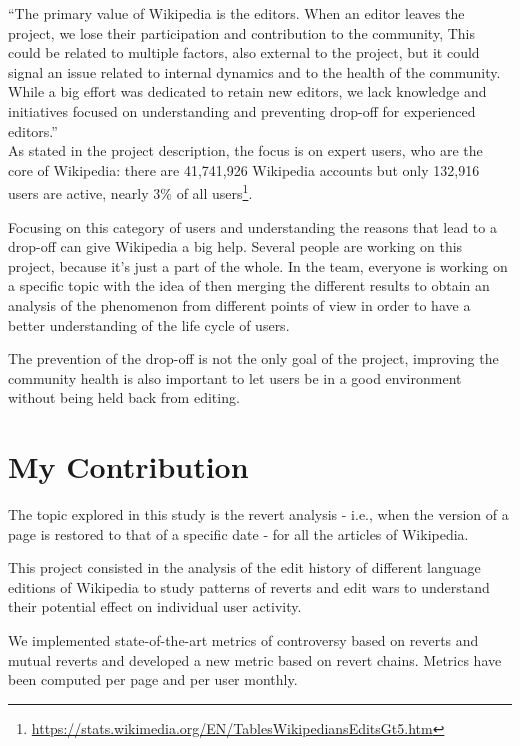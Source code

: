 “The primary value of Wikipedia is the editors. When an editor leaves the project, we lose their
participation and contribution to the community, This could be related to multiple factors, also
external to the project, but it could signal an issue related to internal dynamics and to the health
of the community. While a big effort was dedicated to retain new editors, we lack knowledge and
initiatives focused on understanding and preventing drop-off for experienced editors.”
\\
As stated in the project description, the focus is on expert users, who are the core of Wikipedia:
there are 41,741,926 Wikipedia accounts but only 132,916 users are active, nearly 3\% of all
users\footnote{\url{https://stats.wikimedia.org/EN/TablesWikipediansEditsGt5.htm}}. 

Focusing on this category of users and understanding the reasons that lead to a drop-off can give Wikipedia a
big help. Several people are working on this project, because it's just a part of the whole.
In the team, everyone is working on a specific topic with the idea of then merging the different
results to obtain an analysis of the phenomenon from different points of view in order to have a
better understanding of the life cycle of users.  

The prevention of the drop-off is not the only goal of the project, improving the community health
is also important to let users be in a good environment without being held back from editing. 

\section{My Contribution}
\label{sec:project}
The topic explored in this study is the revert analysis - i.e., when the version of a page is
restored to that of a specific date - for all the articles of Wikipedia.

This project consisted in the analysis of the edit history of different language editions of
Wikipedia to study patterns of reverts and edit wars to understand their potential effect on
individual user activity.

We implemented state-of-the-art metrics of controversy based on reverts and mutual reverts and
developed a new metric based on revert chains. Metrics have been computed per page and per user
monthly.



